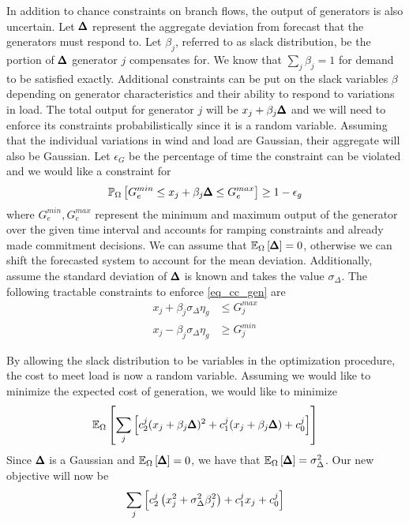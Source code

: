 In addition to chance constraints on branch flows, the output of generators is also uncertain.  Let $\pmb{\Delta}$ represent the aggregate deviation from forecast that the generators must respond to.   Let $\beta_j$, referred to as slack distribution, be the portion of $\pmb{\Delta}$ generator $j$ compensates for.  We know that $\sum_j \beta_j =1$ for demand to be satisfied exactly.  Additional constraints can be put on the slack variables $\beta$ depending on generator characteristics and their ability to respond to variations in load.  The total output for generator $j$ will be $x_j + \beta_j \pmb{\Delta} $
and we will need to enforce its constraints probabilistically since it is a random variable.  Assuming that the individual variations in wind and load are Gaussian, their aggregate will also be Gaussian.   Let $\epsilon_G$ be the percentage of time the constraint can be violated and we would like a constraint for 
\begin{equation}\label{eq_cc_gen}
\mathbb{P}_{\Omega} \left[  G^{min}_e \leq x_j + \beta_j \pmb{\Delta}  \leq G^{max}_e  \right] \geq 1 - \epsilon_g
\end{equation}
where $G^{min}_e, G^{max}_e$ represent the minimum and maximum output of the generator over the given time interval and accounts for ramping constraints and already made commitment decisions. We can assume that $\mathbb{E}_{\Omega} \left[ \pmb{\Delta} \right] = 0$, otherwise we can shift the forecasted system to account for the mean deviation.  Additionally, assume the standard deviation of $\pmb{\Delta}$ is known and takes the value $\sigma_\Delta$.  The following tractable constraints to enforce \ref{eq_cc_gen} are
\begin{align*}
x_j + \beta_j \sigma_\Delta \eta_g &\leq G^{max}_j \\
x_j - \beta_j \sigma_\Delta \eta_g &\geq G^{min}_j 
\end{align*}

By allowing the slack distribution to be variables in the optimization procedure, the cost to meet load is now a random variable.  Assuming we would like to minimize the expected cost of generation, we would like to minimize
\begin{equation*}
\mathbb{E}_{\Omega} \left[  \sum_j \left[ c^j_2 (x_j+\beta_j \pmb{\Delta})^2 + c^j_1 (x_j + \beta_j \pmb{\Delta}) + c_0^j \right]  \right]
\end{equation*}
Since $\pmb{\Delta}$ is a Gaussian and $\mathbb{E}_{\Omega} \left[ \pmb{\Delta} \right] = 0$, we have that $\mathbb{E}_{\Omega} \left[ \pmb{\Delta} \right] = \sigma_\Delta^2$.  Our new objective will now be
\begin{equation*}
\sum_j \left[  c_2^j \left(x_j^2 + \sigma_\Delta^2 \beta_j^2 \right) + c^j_1 x_j + c^j_0 \right]
\end{equation*}

